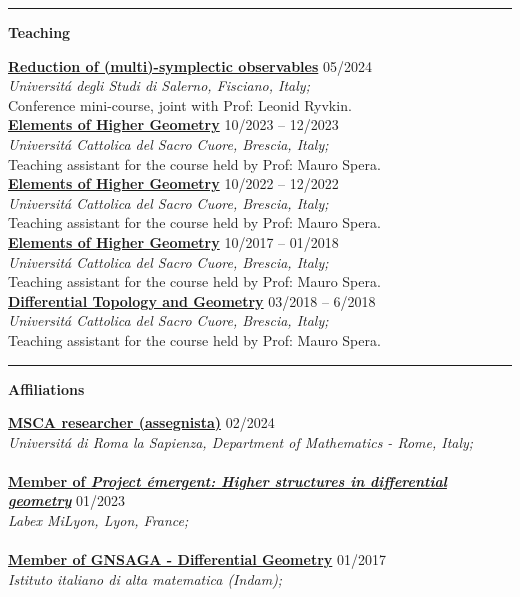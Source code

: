 \documentclass[a4paper]{article}
\newcommand{\block}[1]{\hrule \vspace{0.2cm} \textbf{\Large #1} \vspace{0.2cm}}
\newcommand{\voice}[5]{\href{#4}{\textbf{#1}} \hfill #2 \\ \textit{#3} \\ {\small #5} \vspace{0.2cm} \\}
\begin{document}

	\block{Teaching}

	\voice{Reduction of (multi)-symplectic observables}
		{05/2024}
		{Universit\'a degli Studi di Salerno, Fisciano, Italy;}
		{https://www.antoniomiti.it/teaching/Obs-Constraint-2024/}       
		{Conference mini-course, joint with Prof: Leonid Ryvkin.}
	\voice{Elements of Higher Geometry}
		{10/2023 -- 12/2023}
		{Universit\'a Cattolica del Sacro Cuore, Brescia, Italy;}
		{https://dmf.unicatt.it/miti/teaching/IstGeoSup-22-23/}       
		{Teaching assistant for the course held by Prof: Mauro Spera.}
	\voice{Elements of Higher Geometry}
		{10/2022 -- 12/2022}
		{Universit\'a Cattolica del Sacro Cuore, Brescia, Italy;}
		{https://dmf.unicatt.it/miti/teaching/IstGeoSup-22-23/}       
		{Teaching assistant for the course held by Prof: Mauro Spera.}
	\voice{Elements of Higher Geometry}
		{10/2017 -- 01/2018}
		{Universit\'a Cattolica del Sacro Cuore, Brescia, Italy;}
		{http://docenti.unicatt.it/web/html/index.html\#/programmi/BS/2D9B/75017/2017/21065/MIH341/ita}       
		{Teaching assistant for the course held by Prof: Mauro Spera.}
	\voice{Differential Topology and Geometry}
		{03/2018 -- 6/2018}
		{Universit\'a Cattolica del Sacro Cuore, Brescia, Italy;}
		{http://docenti.unicatt.it/web/html/index.html\#/programmi/BS/2D8B/75017/2017/21065/MGH344/ita}       
		{Teaching assistant for the course held by Prof: Mauro Spera.}



	\block{Affiliations}

	
	\voice{MSCA researcher (assegnista)}
		{02/2024}
		{Universit\'a di Roma la Sapienza, Department of Mathematics - Rome, Italy;}
		{https://www.mat.uniroma1.it/persone/miti}       
		{\vspace{-0.5cm}}
	\voice{Member of \emph{Project \'emergent: Higher structures in differential geometry}}
		{01/2023}
		{Labex MiLyon, Lyon, France;}
		{https://www.dropbox.com/s/36kh0vre45r38b2/2301-MiLyon-HigherGeometry.pdf?dl=0}       
		{\vspace{-0.5cm}}
	\voice{Member of GNSAGA - Differential Geometry}
		{01/2017}
		{Istituto italiano di alta matematica (Indam);}
		{https://web.archive.org/web/20170924125645/http://www.altamatematica.it/gnsaga/node/23}       
		{\vspace{-0.5cm}}
\end{document}

